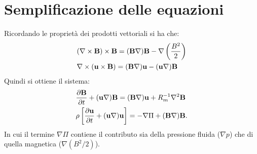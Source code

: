 \section{Semplificazione delle equazioni}
Ricordando le proprietà dei prodotti vettoriali si ha che:
\begin{align}
     & (\nabla \times \vv{B}) \times \vv{B
    } = (\vv{B}\nabla)\vv{B} - \nabla\left(\frac{B^2 }{2}\right)     \\
     & \nabla \times (\vv{u} \times \vv{B}) = (\vv{B} \nabla) \vv{u} - (\vv{u}\nabla) \vv{B}
\end{align}
Quindi si ottiene il sistema:
\begin{align}
    & \pd{\vv{B}} + (\vv{u}\nabla) \vv{B} = (\vv{B} \nabla) \vv{u} + R_m^{-1} \nabla^2 \vv{B} \label{eq:mod1}\\
    & \rho \left[\pd{\vv{u}} + (\vv{u} \nabla) \vv{u}\right] = - \nabla \Pi + (\vv{B}\nabla)\vv{B}.\label{eq:mod2}
\end{align}
In cui il termine $\nabla\Pi$ contiene il contributo sia della pressione fluida ($\nabla p$) che di quella magnetica ($\nabla (B^2/2)$).
